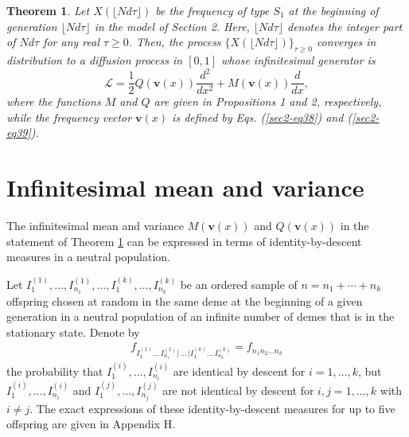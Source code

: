 \documentclass[11pt]{article}
\newtheorem{Theorem}{Theorem}
\begin{document}
\begin{Theorem}\label{Theorem}
Let $X(\lfloor Nd\tau\rfloor)$ be the frequency of type $S_1$ at the beginning of generation $\lfloor Nd\tau\rfloor$ in the model of Section 2. Here, $\lfloor Nd\tau\rfloor$ denotes the integer part of  $Nd\tau$ for any real $\tau\geq0$. Then, the process $\{X(\lfloor Nd\tau\rfloor)\}_{\tau\geq0}$ converges
in distribution to a diffusion process in $[0,1]$ whose infinitesimal generator is 
\begin{equation}
\mathcal{L}=\frac{1}{2}Q(\mathbf{v}(x))\frac{d^2}{dx^2}+M(\mathbf{v}(x))\frac{d}{dx},
\end{equation}
where the functions $M$ and $Q$ are given in Propositions 1 and 2, respectively, while the frequency vector $\mathbf{v}(x)$ is defined by Eqs. (\ref{sec2-eq38}) and (\ref{sec2-eq39}).
\end{Theorem}


\section{Infinitesimal mean and variance}

The infinitesimal mean and variance $M(\mathbf{v}(x))$ and $Q(\mathbf{v}(x))$ in the statement of Theorem \ref{Theorem} can be expressed in terms of identity-by-descent measures in a neutral population.


Let $I_1^{(1)},\ldots,I_{n_1}^{(1)},\ldots,I_1^{(k)},\ldots,I_{n_k}^{(k)}$ be an ordered sample of $n=n_1+\cdots+n_k$ offspring chosen at random in the same deme at the beginning of a given generation in a neutral population of an infinite number of demes that is in the stationary state. Denote by 
\begin{align}\label{identitymeasures}
f_{I_1^{(1)}\ldots \,I_{n_1}^{(1)}| \, \ldots\, |I_1^{(k)}\ldots \,I_{n_k}^{(k)}}=f_{n_1n_2\ldots n_k}
\end{align}
the probability that $I_1^{(i)},\ldots,I_{n_i}^{(i)}$ are identical by descent for $i=1,\ldots,k$, but  $I_1^{(i)},\ldots,I_{n_i}^{(i)}$ and $I_1^{(j)},\ldots,I_{n_j}^{(j)}$ %
are not identical by descent %
for $i, j=1,\ldots,k$ with $i\ne j$. The exact expressions of these identity-by-descent measures for up to five offspring  are given in Appendix H. 
\end{document}
